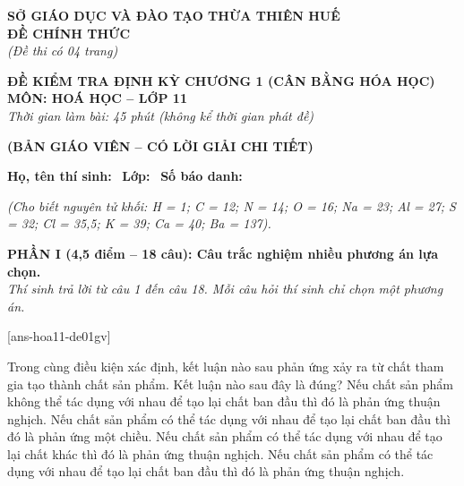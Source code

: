 \documentclass[12pt,a4paper]{article}
\begin{document}
\thispagestyle{firstpage}

\noindent
\begin{minipage}[t]{0.44\textwidth}
	\centering\fontsize{10pt}{12pt}\selectfont
	\textbf{SỞ GIÁO DỤC VÀ ĐÀO TẠO THỪA THIÊN HUẾ}\\
	\textbf{ĐỀ CHÍNH THỨC}\\
	\textit{(Đề thi có 04 trang)}
\end{minipage}\hfill
\begin{minipage}[t]{0.54\textwidth}
	\centering\small
	\textbf{ĐỀ KIỂM TRA ĐỊNH KỲ CHƯƠNG 1 (CÂN BẰNG HÓA HỌC)}\\
	\textbf{MÔN: HOÁ HỌC -- LỚP 11}\\
	\textit{Thời gian làm bài: 45 phút (không kể thời gian phát đề)}\\
\end{minipage}

\smallskip
\begin{center}
	{\color{hfRed}\textbf{\large (BẢN GIÁO VIÊN -- CÓ LỜI GIẢI CHI TIẾT)}}
\end{center}

\smallskip
\noindent\hrulefill
\smallskip

\noindent\textbf{Họ, tên thí sinh:} \dotfill\ \textbf{Lớp:} \dotfill\ \textbf{Số báo danh:} \dotfill

\smallskip
\noindent\textit{(Cho biết nguyên tử khối: H = 1; C = 12; N = 14; O = 16; Na = 23; Al = 27; S = 32; Cl = 35,5; K = 39; Ca = 40; Ba = 137).}
\smallskip

\noindent
\textbf{PHẦN I (4,5 điểm -- 18 câu): Câu trắc nghiệm nhiều phương án lựa chọn.}\\
\textit{Thí sinh trả lời từ câu 1 đến câu 18. Mỗi câu hỏi thí sinh chỉ chọn một phương án.}

[ans-hoa11-de01gv]

\begin{ex}
Trong cùng điều kiện xác định, kết luận nào sau phản ứng xảy ra từ chất tham gia tạo thành chất sản phẩm. Kết luận nào sau đây là đúng?
\choice
{Nếu chất sản phẩm không thể tác dụng với nhau để tạo lại chất ban đầu thì đó là phản ứng thuận nghịch.}
{Nếu chất sản phẩm có thể tác dụng với nhau để tạo lại chất ban đầu thì đó là phản ứng một chiều.}
{Nếu chất sản phẩm có thể tác dụng với nhau để tạo lại chất khác thì đó là phản ứng thuận nghịch.}
{\True Nếu chất sản phẩm có thể tác dụng với nhau để tạo lại chất ban đầu thì đó là phản ứng thuận nghịch.}
\end{ex}
\end{document}
